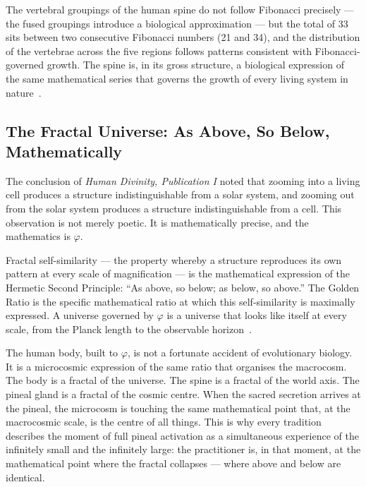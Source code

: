 \documentclass[12pt, a4paper]{article}
\begin{document}
The vertebral groupings of the human spine do not follow Fibonacci precisely —
the fused groupings introduce a biological approximation — but the total of 33
sits between two consecutive Fibonacci numbers (21 and 34), and the
distribution of the vertebrae across the five regions follows patterns
consistent with Fibonacci-governed growth. The spine is, in its gross structure,
a biological expression of the same mathematical series that governs the growth
of every living system in nature~\autocite{schneider1994}.

\subsection{The Fractal Universe: As Above, So Below, Mathematically}

The conclusion of \emph{Human Divinity, Publication I} noted that zooming into a living
cell produces a structure indistinguishable from a solar system, and zooming
out from the solar system produces a structure indistinguishable from a cell.
This observation is not merely poetic. It is mathematically precise, and the
mathematics is $\varphi$.

Fractal self-similarity — the property whereby a structure reproduces its own
pattern at every scale of magnification — is the mathematical expression of the
Hermetic Second Principle: ``As above, so below; as below, so above.'' The
Golden Ratio is the specific mathematical ratio at which this self-similarity
is maximally expressed. A universe governed by $\varphi$ is a universe that
looks like itself at every scale, from the Planck length to the observable
horizon~\autocite{livio2002}.

The human body, built to $\varphi$, is not a fortunate accident of evolutionary
biology. It is a microcosmic expression of the same ratio that organises the
macrocosm. The body is a fractal of the universe. The spine is a fractal of
the world axis. The pineal gland is a fractal of the cosmic centre. When the
sacred secretion arrives at the pineal, the microcosm is touching the same
mathematical point that, at the macrocosmic scale, is the centre of all things.
This is why every tradition describes the moment of full pineal activation as a
simultaneous experience of the infinitely small and the infinitely large: the
practitioner is, in that moment, at the mathematical point where the fractal
collapses — where above and below are identical.

\end{document}
